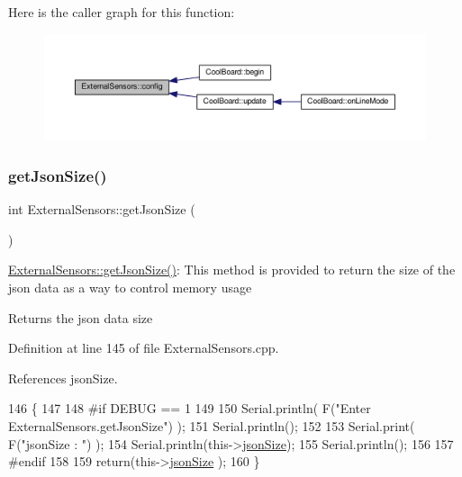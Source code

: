 Here is the caller graph for this function\+:
\nopagebreak
\begin{figure}[H]
\begin{center}
\leavevmode
\includegraphics[width=350pt]{classExternalSensors_a862a4bd11346b37270d0244c2adabe5a_icgraph}
\end{center}
\end{figure}
\mbox{\label{classExternalSensors_a8e3a93efa8f5a0477f300e26084b6625}} 
\subsubsection{\texorpdfstring{get\+Json\+Size()}{getJsonSize()}}
{\footnotesize\ttfamily int External\+Sensors\+::get\+Json\+Size (\begin{DoxyParamCaption}{ }\end{DoxyParamCaption})}

\hyperlink{classExternalSensors_a8e3a93efa8f5a0477f300e26084b6625}{External\+Sensors\+::get\+Json\+Size()}\+: This method is provided to return the size of the json data as a way to control memory usage

\begin{DoxyReturn}{Returns}
the json data size 
\end{DoxyReturn}


Definition at line 145 of file External\+Sensors.\+cpp.



References json\+Size.


\begin{DoxyCode}
146 \{
147     
148 \textcolor{preprocessor}{#if DEBUG == 1}
149 
150     Serial.println( F(\textcolor{stringliteral}{"Enter ExternalSensors.getJsonSize"}) );
151     Serial.println();
152     
153     Serial.print( F(\textcolor{stringliteral}{"jsonSize : "}) );
154     Serial.println(this->\hyperlink{classExternalSensors_acacea86d74d967b57fcff282d26cff57}{jsonSize});
155     Serial.println();
156 
157 \textcolor{preprocessor}{#endif }
158 
159     \textcolor{keywordflow}{return}(this->\hyperlink{classExternalSensors_acacea86d74d967b57fcff282d26cff57}{jsonSize} );
160 \}
\end{DoxyCode}
\mbox{\label{classExternalSensors_a78c2bf55084435dd51d3c559b2d3c6f3}} 
